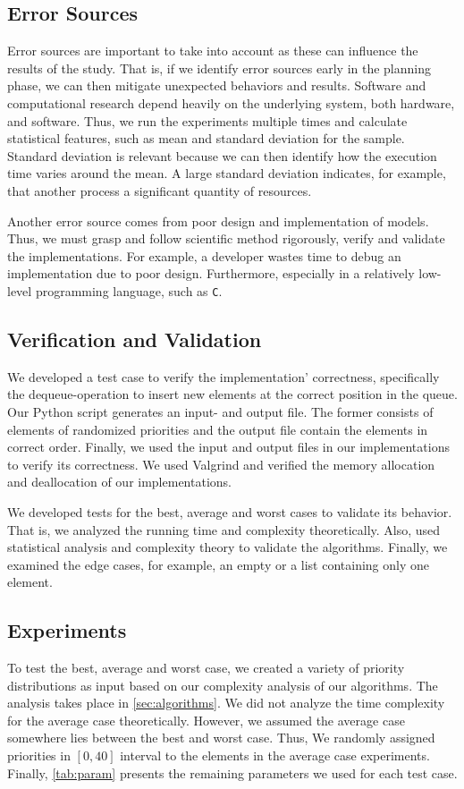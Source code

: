 \documentclass[a4paper,11pt]{kth-mag}
\newcommand*{\skippara}{\par\vspace{\baselineskip} \noindent}
\begin{document}
\subsection{Error Sources}
Error sources are important to take into account as these can influence the results of the study.
That is, if we identify error sources early in the planning phase, we can then mitigate unexpected behaviors and results.
Software and computational research depend heavily on the underlying system, both hardware, and software.
Thus, we run the experiments multiple times and calculate statistical features, such as mean and standard deviation for the sample.
Standard deviation is relevant because we can then identify how the execution time varies around the mean.
A large standard deviation indicates, for example, that another process a significant quantity of resources.

\skippara Another error source comes from poor design and implementation of models.
Thus, we must grasp and follow scientific method rigorously, verify and validate the implementations.
For example, a developer wastes time to debug an implementation due to poor design.
Furthermore, especially in a relatively low-level programming language, such as \texttt{C}.

\subsection{Verification and Validation}
We developed a test case to verify the implementation' correctness, specifically the dequeue-operation to insert new elements at the correct position in the queue.
Our Python script generates an input- and output file.
The former consists of elements of randomized priorities and the output file contain the elements in correct order.
Finally, we used the input and output files in our implementations to verify its correctness.
We used Valgrind and verified the memory allocation and deallocation of our implementations.

\skippara We developed tests for the best, average and worst cases to validate its behavior.
That is, we analyzed the running time and complexity theoretically.
Also, used statistical analysis and complexity theory to validate the algorithms.
Finally, we examined the edge cases, for example, an empty or a list containing only one element.

\subsection{Experiments}
To test the best, average and worst case, we created a variety of priority distributions as input based on our complexity analysis of our algorithms. The analysis takes place in \cref{sec:algorithms}.
We did not analyze the time complexity for the average case theoretically.
However, we assumed the average case somewhere lies between the best and worst case.
Thus, We randomly assigned priorities in $[0, 40]$ interval to the elements in the average case experiments.
Finally, \cref{tab:param} presents the remaining parameters we used for each test case.
\end{document}
